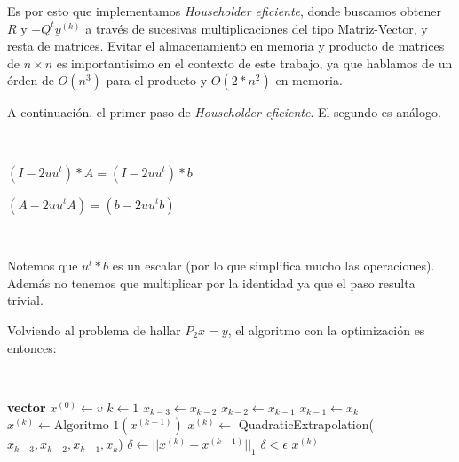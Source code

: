 Es por esto que implementamos \emph{Householder eficiente}, donde buscamos obtener $R$ y $-Q^{t}y^{(k)}$ a trav\'es de sucesivas multiplicaciones del tipo Matriz-Vector, y resta de matrices. Evitar el almacenamiento en memoria y producto de matrices de $n \times n$ es importantisimo en el contexto de este trabajo, ya que hablamos de un \'orden de $O(n^3)$ para el producto y $O(2*n^2)$ en memoria.

A continuaci\'on, el primer paso de \emph{Householder eficiente}. El segundo es an\'alogo.

~

$(I - 2uu^{t})*A = (I - 2uu^{t})*b$

$(A - 2uu^{t}A) = (b - 2uu^{t}b)$

~

Notemos que $u^{t}*b$ es un escalar (por lo que simplifica mucho las operaciones). Además no tenemos que multiplicar por la 
identidad ya que el paso resulta trivial.

Volviendo al problema de hallar $P_{2}x = y$, el algoritmo con la optimización es entonces: 

~

\begin{algorithmic}
		\State \textbf{vector} $x^{(0)} \gets v$
		\State $k \gets 1$ \Repeat
		\State $x_{k-3} \gets x_{k-2}$
		\State $x_{k-2} \gets x_{k-1}$
		\State $x_{k-1} \gets x_{k}$
		\State $x^{(k)} \gets \text{Algoritmo 1}(x^{(k-1)})$
			\State $x^{(k)} \gets$ QuadraticExtrapolation($x_{k-3},x_{k-2},x_{k-1},x_{k}$)
		\EndIf
		\State $\delta \gets ||x^{(k)} - x^{(k-1)}||_{1}$ \Until $\delta < \epsilon$
		\State \Return $x^{(k)}$
	\EndFunction
\end{algorithmic}



